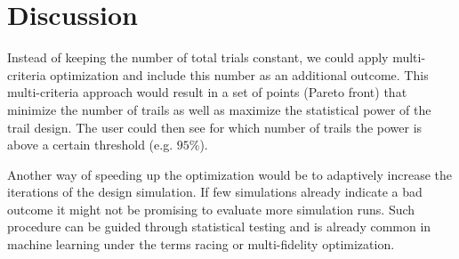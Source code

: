 \documentclass[bimj,fleqn]{w-art}
\theoremstyle{plain}
\theoremstyle{definition}
\begin{document}




\section{Discussion}



Instead of keeping the number of total trials constant, we could apply multi-criteria optimization and include this number as an additional outcome.
This multi-criteria approach would result in a set of points (Pareto front) that minimize the number of trails as well as maximize the statistical power of the trail design.
The user could then see for which number of trails the power is above a certain threshold (e.g. $95\%$).

Another way of speeding up the optimization would be to adaptively increase the iterations of the design simulation. 
If few simulations already indicate a bad outcome it might not be promising to evaluate more simulation runs.
Such procedure can be guided through statistical testing and is already common in machine learning under the terms racing or multi-fidelity optimization.

\end{document}
